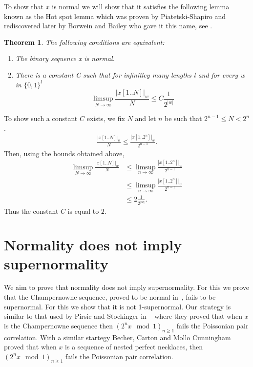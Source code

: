 \documentclass[11pt,a4paper]{tesis}
\newtheorem{theorem}{Theorem}[]
\begin{document}
To show that $x$ is normal we will show that it satisfies the following lemma known as the
Hot spot lemma which was proven by Piatetski-Shapiro  and rediscovered later by Borwein and Bailey \cite{hotspot} who gave it this name, see \cite[Theorem 7.4.1]{BC2018}.
\begin{theorem}
  The following conditions are equivalent:
  \begin{enumerate}
    \item The binary sequence x is normal.
    \item There is a constant C such that for infinitley many lengths l and for every w in $\{0,1\}^l$
    $$\limsup_{N\to \infty}  \frac{|x[1.. N]|_w }{N} \leq C \frac{1}{2^{|w|}}$$
  \end{enumerate}
\end{theorem} 
 

To show such a constant $C$ exists, we fix $N$ and let $n$ be such that $2^{n-1}\leq N<2^{n}$. 
\begin{align*}
\frac{{|x[1.. N]|_w }}{N}\leq \frac{{|x[1.. 2^{n}]|_w }}{2^{n-1}}.
\end{align*}
Then, using the bounds obtained above,
\begin{align*}
\limsup_{N\to \infty}  \frac{|x[1.. N]|_w }{N} 
&\leq \limsup_{n\to \infty}\frac{{|x[1.. 2^{n}]|_w }}{2^{n-1}}\\
&\leq \limsup_{n\to \infty}\frac{{|x[1.. 2^{n}]|_w }}{2^{n-1}}\\
&\leq 2\frac{1}{2^{|w|}}.
\end{align*}
Thus the constant $C$ is equal to $2$.

\pagebreak

\section{Normality does not imply supernormality}
We aim to prove that normality does not imply supernormality. 
For this we prove that the Champernowne sequence, proved to be normal in~\cite{champern}, 
fails to be supernormal. For this we show that  it is not 1-supernormal.
Our strategy is similar to that used by Pirsic and Stockinger in ~\cite{PS2019}  where they proved that when $x$ is 
the Champernowne 
sequence then $(2^n x \mod 1)_{n\geq 1}$ fails the Poissonian pair correlation.
With a similar startegy  Becher, Carton and Mollo Cunningham ~\cite{BCC2019}
 proved that when $x$ is a sequence of nested perfect necklaces, then $(2^n x \mod 1)_{n\geq 1}$ fails the Poissonian pair correlation.
\end{document}
